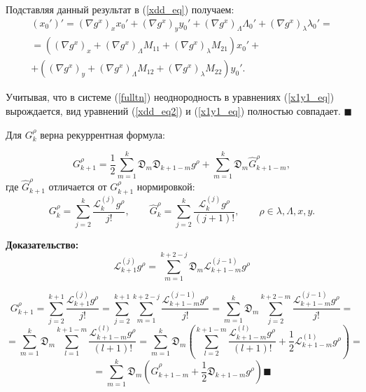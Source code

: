 \begin{enumerate}
Подставляя данный результат в (\ref{xdd_eq}) получаем:
\begin{multline}
(x_0')' = (\nabla g^x)_x x_0' + (\nabla g^x)_y y_0' + (\nabla g^x)_\Lambda \Lambda_0' + (\nabla g^x)_\lambda \lambda_0' = \\
= 
\left( (\nabla g^x)_x + (\nabla g^x)_\Lambda M_{11} + (\nabla g^x)_\lambda M_{21} \right) x_0' +\\
+\left( (\nabla g^x)_y + (\nabla g^x)_\Lambda M_{12} + (\nabla g^x)_\lambda M_{22} \right) y_0'.
\label{xdd_eq2}
\end{multline}

Учитывая, что в системе (\ref{fulltn}) неоднородность в уравнениях (\ref{x1y1_eq}) вырождается, вид уравнений (\ref{xdd_eq2}) и (\ref{x1y1_eq}) полностью совпадает.
$\blacksquare$

\end{enumerate}%




\begin{utv}

Для $G_k^\rho$ верна рекуррентная формула:

\begin{equation*}
G_{k+1}^\rho = \frac12 \sum_{m=1}^k \mathfrak{D}_m \mathfrak{D}_{k+1-m} g^\rho + \sum_{m=1}^k \mathfrak{D}_m \hat G_{k+1-m}^\rho,
\end{equation*}
где $\hat G_{k+1}^\rho$ отличается от $G_{k+1}^\rho$ нормировкой:
$$G_k^\rho = \sum_{j=2}^{k} \frac{\mathcal{L}_k^{(j)} g^\rho }{j!}, \qquad
\hat G_k^\rho = \sum_{j=2}^{k} \frac{\mathcal{L}_k^{(j)} g^\rho }{(j+1)!}, \qquad
\rho \in {\lambda, \Lambda, x, y}.$$
\end{utv}
\textbf{Доказательство:}\nopagebreak[4]
$$\mathcal{L}_{k+1}^{(j)}g^\rho = \sum_{m=1}^{k+2-j} \mathfrak{D}_m \mathcal{L}_{k+1-m}^{(j-1)} g^\rho$$

$$G_{k+1}^\rho = \sum_{j=2}^{k+1} \frac{\mathcal{L}_{k+1}^{(j)} g^\rho }{j!} = \sum_{j=2}^{k+1} \sum_{m=1}^{k+2-j} \frac{\mathcal{L}_{k+1-m}^{(j-1)} g^\rho }{j!} = \sum_{m=1}^k \mathfrak{D}_m \sum_{j=2}^{k+2-m} \frac{\mathcal{L}_{k+1-m}^{(j-1)} g^\rho }{j!} =$$
$$= \sum_{m=1}^k \mathfrak{D}_m \sum_{l=1}^{k+1-m} \frac{\mathcal{L}_{k+1-m}^{(l)} g^\rho }{(l+1)!} = \sum_{m=1}^k \mathfrak{D}_m \left( \sum_{l=2}^{k+1-m} \frac{\mathcal{L}_{k+1-m}^{(l)} g^\rho }{(l+1)!} + \frac12 \mathcal{L}_{k+1-m}^{(1)}g^\rho \right) =$$
$$= \sum_{m=1}^k \mathfrak{D}_m \left( \hat G_{k+1-m}^\rho + \frac12 \mathfrak{D}_{k+1-m}g^\rho \right) \blacksquare$$



